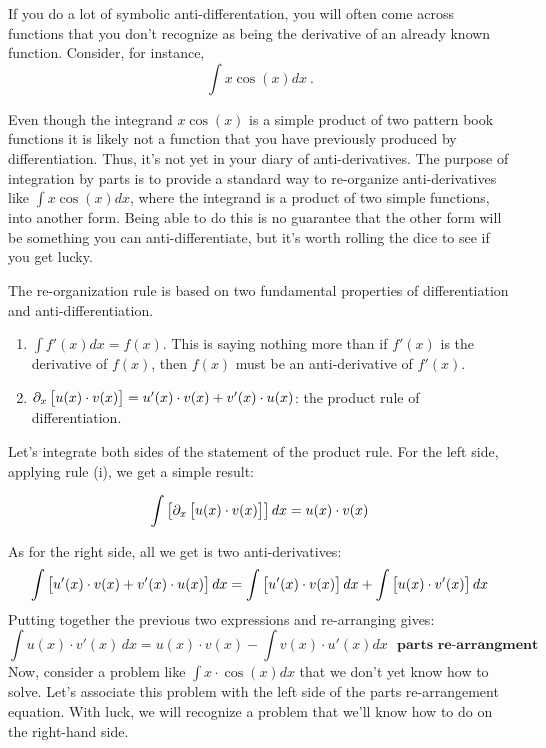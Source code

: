 \documentclass[
  letterpaper,
  DIV=11,
  numbers=noendperiod,
  oneside]{scrreprt}
\begin{document}
If you do a lot of symbolic anti-differentation, you will often come
across functions that you don't recognize as being the derivative of an
already known function. Consider, for instance, \[\int x \cos(x) dx\ .\]

Even though the integrand \(x \cos(x)\) is a simple product of two
pattern book functions it is likely not a function that you have
previously produced by differentiation. Thus, it's not yet in your diary
of anti-derivatives. The purpose of integration by parts is to provide a
standard way to re-organize anti-derivatives like \(\int x \cos(x) dx\),
where the integrand is a product of two simple functions, into another
form. Being able to do this is no guarantee that the other form will be
something you can anti-differentiate, but it's worth rolling the dice to
see if you get lucky.

The re-organization rule is based on two fundamental properties of
differentiation and anti-differentiation.

\begin{enumerate}
\def\labelenumi{\roman{enumi}.}
\item
  \(\int f'(x) dx = f(x)\). This is saying nothing more than if
  \(f'(x)\) is the derivative of \(f(x)\), then \(f(x)\) must be an
  anti-derivative of \(f'(x)\).
\item
  \(\partial_x \left[\strut u(x)\cdot v(x) \right] = u'(x)\cdot v(x) + v'(x)\cdot u(x)\):
  the product rule of differentiation.
\end{enumerate}

Let's integrate both sides of the statement of the product rule. For the
left side, applying rule (i), we get a simple result:

\[\int\left[\strut\partial_x \left[\strut u(x)\cdot v(x) \right]\right] dx = u(x) \cdot v(x)\]

As for the right side, all we get is two anti-derivatives:
\[\int\left[\strut u'(x)\cdot v(x) + v'(x)\cdot u(x)\right]dx =
\int\left[\strut u'(x)\cdot v(x)\right]dx + \int\left[\strut u(x)\cdot v'(x)\right]dx\]
Putting together the previous two expressions and re-arranging gives:
\[\int u(x)\cdot v'(x)\, dx = u(x) \cdot v(x) - \int  v(x)\cdot u'(x)dx\ \ \ \mathbf{ \text{parts re-arrangment}}\]
Now, consider a problem like \(\int x \cdot \cos(x) dx\) that we don't
yet know how to solve. Let's associate this problem with the left side
of the parts re-arrangement equation. With luck, we will recognize a
problem that we'll know how to do on the right-hand side.
\end{document}
